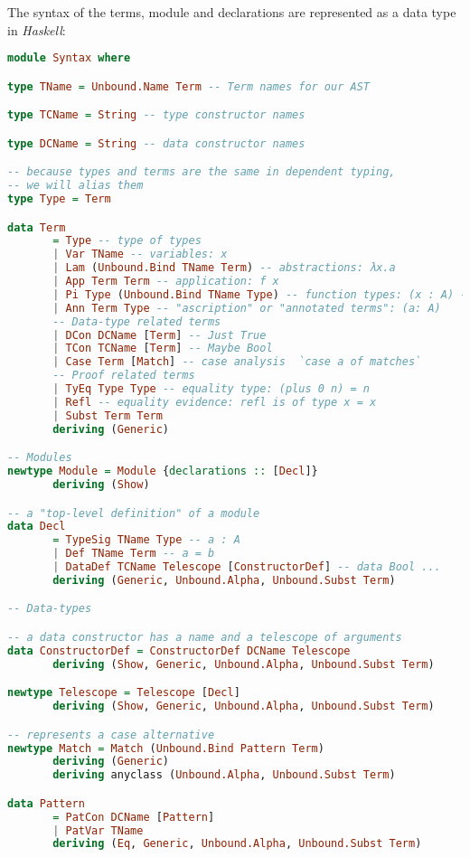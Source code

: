 The syntax of the terms, module and declarations are represented as a data type in \emph{Haskell}:

\begin{lstlisting}[language=Haskell]
module Syntax where

type TName = Unbound.Name Term -- Term names for our AST

type TCName = String -- type constructor names

type DCName = String -- data constructor names

-- because types and terms are the same in dependent typing,
-- we will alias them
type Type = Term

data Term
       = Type -- type of types
       | Var TName -- variables: x
       | Lam (Unbound.Bind TName Term) -- abstractions: λx.a
       | App Term Term -- application: f x
       | Pi Type (Unbound.Bind TName Type) -- function types: (x : A) -> B
       | Ann Term Type -- "ascription" or "annotated terms": (a: A)
       -- Data-type related terms
       | DCon DCName [Term] -- Just True
       | TCon TCName [Term] -- Maybe Bool
       | Case Term [Match] -- case analysis  `case a of matches`
       -- Proof related terms
       | TyEq Type Type -- equality type: (plus 0 n) = n
       | Refl -- equality evidence: refl is of type x = x
       | Subst Term Term
       deriving (Generic)

-- Modules
newtype Module = Module {declarations :: [Decl]}
       deriving (Show)

-- a "top-level definition" of a module
data Decl
       = TypeSig TName Type -- a : A
       | Def TName Term -- a = b
       | DataDef TCName Telescope [ConstructorDef] -- data Bool ...
       deriving (Generic, Unbound.Alpha, Unbound.Subst Term)

-- Data-types

-- a data constructor has a name and a telescope of arguments
data ConstructorDef = ConstructorDef DCName Telescope
       deriving (Show, Generic, Unbound.Alpha, Unbound.Subst Term)

newtype Telescope = Telescope [Decl]
       deriving (Show, Generic, Unbound.Alpha, Unbound.Subst Term)

-- represents a case alternative
newtype Match = Match (Unbound.Bind Pattern Term)
       deriving (Generic)
       deriving anyclass (Unbound.Alpha, Unbound.Subst Term)

data Pattern
       = PatCon DCName [Pattern]
       | PatVar TName
       deriving (Eq, Generic, Unbound.Alpha, Unbound.Subst Term)
\end{lstlisting}

